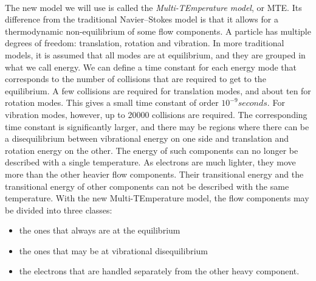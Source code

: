       \paragraph{}
      The new model we will use is called the \emph{Multi-TEmperature model}, or MTE.
      Its difference from the traditional Navier--Stokes model is that it allows for a thermodynamic non-equilibrium of some flow components.
      A particle has multiple degrees of freedom: translation, rotation and vibration.
      In more traditional models, it is assumed that all modes are at equilibrium, and they are grouped in what we call energy.
      We can define a time constant for each energy mode that corresponds to the number of collisions that are required to get to the equilibrium.
      A few collisions are required for translation modes, and about ten for rotation modes.
      This gives a small time constant of order $10^{-9}\si{seconds}$.
      For vibration modes, however, up to \num{20000} collisions are required.
      The corresponding time constant is significantly larger, and there may be regions where there can be a disequilibrium between vibrational energy on one side and translation and rotation energy on the other.
      The energy of such components can no longer be described with a single temperature.
      As electrons are much lighter, they move more than the other heavier flow components.
      Their transitional energy and the transitional energy of other components can not be described with the same temperature.
      With the new Multi-TEmperature model, the flow components may be divided into three classes:
      \begin{itemize}
        \item the ones that always are at the equilibrium
        \item the ones that may be at vibrational disequilibrium
        \item the electrons that are handled separately from the other heavy component.
      \end{itemize}

